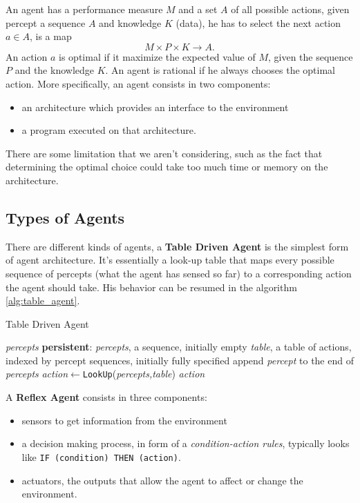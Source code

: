 \documentclass[10pt, letterpaper]{report}
\begin{document}
An agent has a performance measure $M$ and a set $A$ of all possible actions, given percept a sequence $A$ and knowledge $K$ (data), he has to select the next action $a\in A$, is a map\begin{equation}
    M\times P\times K \longrightarrow A.
\end{equation} 
An action $a$ is optimal if it maximize the expected value of $M$, given the sequence $P$ and the knowledge $K$. An agent is rational if he always chooses the optimal action. More specifically, an agent consists in two components:\begin{itemize}
    \item an architecture which provides an interface to the environment
    \item a program executed on that architecture.
\end{itemize}
There are some limitation that we aren't considering, such as the fact that determining the optimal choice could take too much time or memory on the architecture.

\subsection{Types of Agents}
There are different kinds of agents, a \textbf{Table Driven Agent} is the simplest form of agent architecture. It's essentially a look-up table that maps every possible sequence of percepts (what the agent has sensed so far) to a corresponding action the agent should take. His behavior can be resumed in the algorithm \ref{alg:table_agent}.

\begin{algorithm}
    \caption{Table Driven Agent}\label{alg:table_agent}
    \begin{algorithmic}
    \Require \textit{percepts}
    \State \textbf{persistent}: \textit{percepts}, a sequence, initially empty
    \State\hphantom{persistent: .} \textit{table}, a table of actions, indexed by percept sequences, initially fully specified
    \State append \textit{percept} to the end of \textit{percepts} 
    \State \textit{action}$\leftarrow$\texttt{LookUp}(\textit{percepts,table})
    \State\Return \textit{action}
    \end{algorithmic}
\end{algorithm}
\bigskip


A \textbf{Reflex Agent} consists in three components:\begin{itemize}
    \item sensors to get information from the environment
    \item a decision making process, in form of a \textit{condition-action rules}, typically looks like \texttt{IF (condition) THEN (action)}.
    \item actuators, the outputs that allow the agent to affect or change the environment.
\end{itemize}
\end{document}
